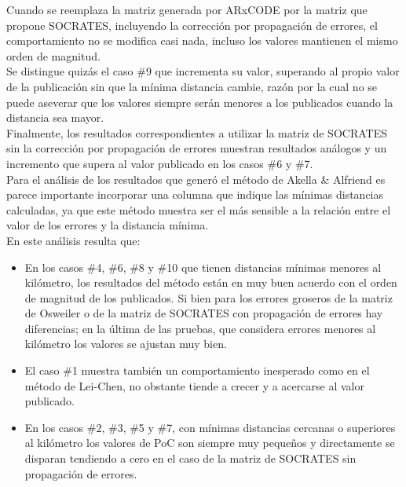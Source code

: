 Cuando se reemplaza la matriz generada por ARxCODE por la matriz que propone SOCRATES, incluyendo la correcci\'on por propagaci\'on de errores, el comportamiento no se modifica casi nada, incluso los valores mantienen el mismo orden de magnitud.\\

Se distingue quiz\'as el caso \#9 que incrementa su valor, superando al propio valor de la publicaci\'on sin que la m\'inima distancia cambie, raz\'on por la cual no se puede aseverar que los valores siempre ser\'an menores a los publicados cuando la distancia sea mayor.\\

Finalmente, los resultados correspondientes a utilizar la matriz de SOCRATES sin la correcci\'on por propagaci\'on de errores muestran resultados an\'alogos y un incremento que supera al valor publicado en los casos \#6 y \#7.\\

Para el an\'alisis de los resultados que gener\'o el m\'etodo de Akella \& Alfriend es parece importante incorporar una columna que indique las m\'inimas distancias calculadas, ya que este m\'etodo muestra ser el m\'as sensible a la relaci\'on entre el valor de los errores y la distancia m\'inima.\\

En este an\'alisis resulta que:\\

\begin{itemize}
 \item En los casos \#4, \#6, \#8 y \#10 que tienen distancias m\'inimas menores al kil\'ometro, los resultados del m\'etodo est\'an en muy buen acuerdo con el orden de magnitud de los publicados. Si bien para los errores groseros de la matriz de Osweiler o de la matriz de SOCRATES con propagaci\'on de errores hay diferencias; en la \'ultima de las pruebas, que considera errores menores al kil\'ometro los valores se ajustan muy bien.\\
 \item El caso \#1 muestra tambi\'en un comportamiento inesperado como en el m\'etodo de Lei-Chen, no obstante tiende a crecer y a acercarse al valor publicado.\\
 \item En los casos \#2, \#3, \#5 y \#7, con m\'inimas distancias cercanas o superiores al kil\'ometro los valores de PoC son siempre muy pequeños y directamente se disparan tendiendo a cero en el caso de la matriz de SOCRATES sin propagaci\'on de errores.\\
\end{itemize}



